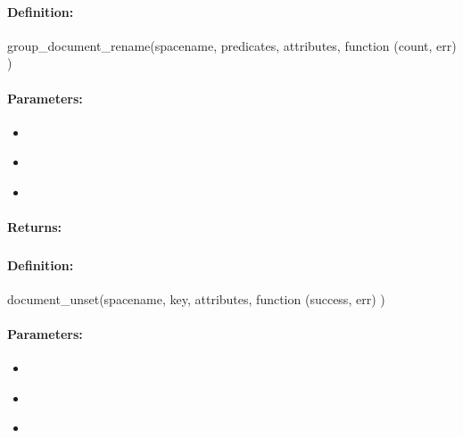 \paragraph{Definition:}
\begin{javascriptcode}
group_document_rename(spacename, predicates, attributes, function (count, err) {})
\end{javascriptcode}
\paragraph{Parameters:}
\begin{itemize}[noitemsep]
\item {}\\

\item {}\\

\item {}\\

\end{itemize}

\paragraph{Returns:}


\pagebreak
\subsubsection{}
\label{api:nodejs:document_unset}


\paragraph{Definition:}
\begin{javascriptcode}
document_unset(spacename, key, attributes, function (success, err) {})
\end{javascriptcode}
\paragraph{Parameters:}
\begin{itemize}[noitemsep]
\item {}\\

\item {}\\

\item {}\\

\end{itemize}

